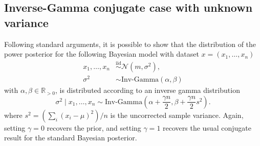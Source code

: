 \documentclass[12pt]{article}
\begin{document}
\subsection{Inverse-Gamma conjugate case with unknown variance}
Following standard arguments, it is possible to show that the distribution of
the power posterior for the following Bayesian model with dataset $x = (x_1,
\ldots, x_n)$
\begin{subequations}
\begin{align}
x_1, \ldots, x_n &\overset{\mathrm{iid}}{\sim} \mathcal{N}(m, \sigma^2), \\
\sigma^2 &\sim \text{Inv-Gamma}(\alpha, \beta)
\end{align}
\end{subequations}
with $\alpha, \beta \in \mathbb{R}_{>0}$, is distributed according to an
inverse gamma distribution
\begin{equation*}
\sigma^2 \; | \; x_1, \ldots, x_n \sim \text{Inv-Gamma}\left( \alpha + \frac{\gamma n}{2}, \beta + \frac{\gamma n}{2} s^2 \right). 
\end{equation*}
where $s^2 = (\sum_{i} \left( x_i - \mu \right)^2)/n$ is the uncorrected sample
variance. Again, setting $\gamma = 0$ recovers the prior, and setting $\gamma =
1$ recovers the usual conjugate result for the standard Bayesian posterior.
\end{document}
